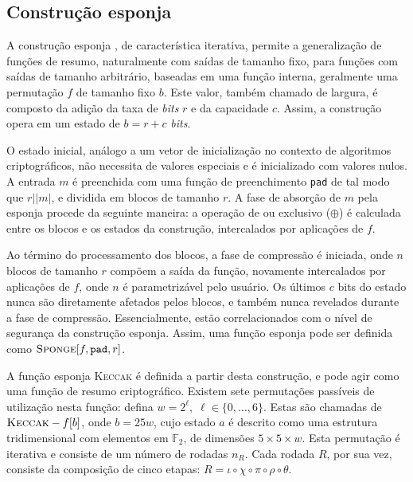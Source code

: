 \documentclass[12pt]{report}
\newcommand{\length}[1]{\vert #1 \vert}
\begin{document}
\subsection{Construção esponja}

A construção esponja \cite{SpongeReference}, de característica iterativa,
permite a generalização de funções de resumo, naturalmente com saídas de
tamanho fixo, para funções com saídas de tamanho arbitrário, baseadas em uma
função interna, geralmente uma permutação $f$ de tamanho fixo $b$. Este valor,
também chamado de largura, é composto da adição da taxa de \emph{bits} $r$ e da
capacidade $c$. Assim, a construção opera em um estado de $b = r + c$
\emph{bits}.

O estado inicial, análogo a um vetor de inicialização no contexto de algoritmos
criptográficos, não necessita de valores especiais e é inicializado com valores
nulos. A entrada $m$ é preenchida com uma função de preenchimento \texttt{pad}
de tal modo que $r \mid \length{m}$, e dividida em blocos de tamanho $r$. A
fase de absorção de $m$ pela esponja procede da seguinte maneira: a operação de
ou exclusivo ($\oplus$) é calculada entre os blocos e os estados da construção,
intercalados por aplicações de $f$.


Ao término do processamento dos blocos, a fase de compressão é iniciada, onde
$n$ blocos de tamanho $r$ compõem a saída da função, novamente intercalados por
aplicações de $f$, onde $n$ é parametrizável pelo usuário. Os últimos $c$ bits
do estado nunca são diretamente afetados pelos blocos, e também nunca revelados
durante a fase de compressão. Essencialmente, estão correlacionados com o nível
de segurança da construção esponja. Assim, uma função esponja pode ser definida
como $\textsc{Sponge}[f, \texttt{pad}, r]$.

A função esponja \textsc{Keccak} \cite{KeccakReference} é definida a partir
desta construção, e pode agir como uma função de resumo criptográfico. Existem
sete permutações passíveis de utilização nesta função: defina $w = 2^{\ell}, \;
\ell \in \{0, \dots, 6\}$.  Estas são chamadas de $\textsc{Keccak}-f[b]$, onde
$b = 25w$, cujo estado $a$ é descrito como uma estrutura tridimensional com
elementos em $\mathbb{F}_2$, de dimensões $5 \times 5 \times w$. Esta
permutação é iterativa e consiste de um número de rodadas $n_R$. Cada rodada
$R$, por sua vez, consiste da composição de cinco etapas: $R = \iota \circ \chi
\circ \pi \circ \rho \circ \theta$.
\end{document}
